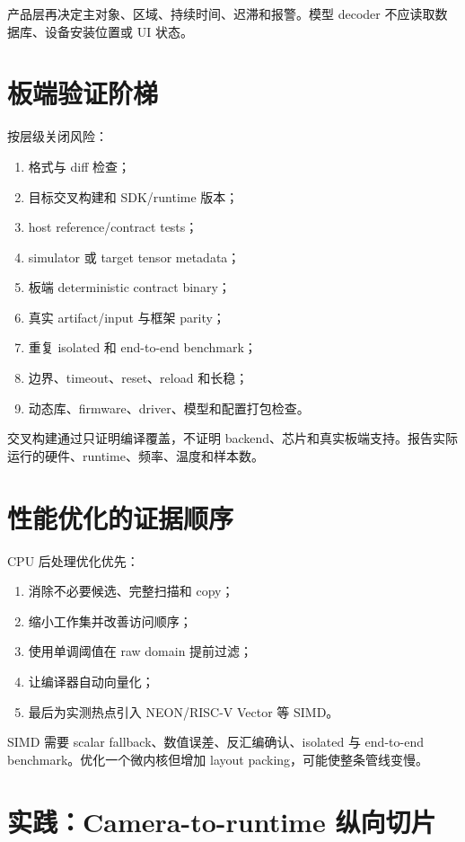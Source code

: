 产品层再决定主对象、区域、持续时间、迟滞和报警。模型 decoder 不应读取数据库、设备安装位置或 UI 状态。

\section{板端验证阶梯}

按层级关闭风险：

\begin{enumerate}
  \item 格式与 diff 检查；
  \item 目标交叉构建和 SDK/runtime 版本；
  \item host reference/contract tests；
  \item simulator 或 target tensor metadata；
  \item 板端 deterministic contract binary；
  \item 真实 artifact/input 与框架 parity；
  \item 重复 isolated 和 end-to-end benchmark；
  \item 边界、timeout、reset、reload 和长稳；
  \item 动态库、firmware、driver、模型和配置打包检查。
\end{enumerate}

交叉构建通过只证明编译覆盖，不证明 backend、芯片和真实板端支持。报告实际运行的硬件、runtime、频率、温度和样本数。

\section{性能优化的证据顺序}

CPU 后处理优化优先：

\begin{enumerate}
  \item 消除不必要候选、完整扫描和 copy；
  \item 缩小工作集并改善访问顺序；
  \item 使用单调阈值在 raw domain 提前过滤；
  \item 让编译器自动向量化；
  \item 最后为实测热点引入 NEON/RISC-V Vector 等 SIMD。
\end{enumerate}

SIMD 需要 scalar fallback、数值误差、反汇编确认、isolated 与 end-to-end benchmark。优化一个微内核但增加 layout packing，可能使整条管线变慢。

\section{实践：Camera-to-runtime 纵向切片}

